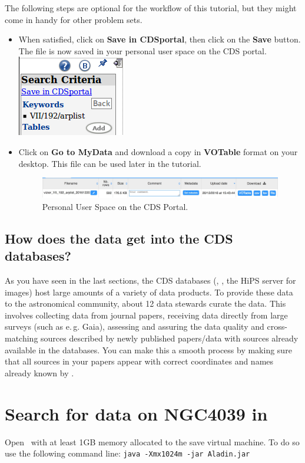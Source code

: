 \documentclass [a4paper, 12pt]{article}
\begin{document}
The following steps are optional for the workflow of this tutorial, but they
might come in handy for other problem sets.
\begin{itemize}
\item When satisfied, click on \textbf{Save in CDSportal}, then click
on the \textbf{Save} button. The file is now saved in your personal
user space on the CDS portal.\includegraphics[width=0.1
\textwidth]{../images/vizier_saveto_CDSportal.png}
\item Click on \textbf{Go to MyData} and download a copy in
\textbf{VOTable} format on your desktop. This file can be used later
in the tutorial.
\begin{figure}[H]
\center
\includegraphics[width=1  \textwidth]{../images/cdsportal_mydata.jpg}
\caption{Personal User Space on the CDS Portal.}
\label{fig:download}
\end{figure}
\end{itemize}

\subsection{How does the data get into the CDS databases?}
As you have seen in the last sections, the CDS databases (\simbad, \vizier, the
HiPS server for images) host large amounts of a variety of data products. To provide these data to the astronomical community, about 12 data stewards curate the data. This involves collecting
data from journal papers, receiving data directly from large surveys (such as
e.\,g. Gaia), assessing and assuring the data quality and cross-matching
sources described by newly published papers/data with sources already available
in the databases. You can make this a smooth process by making sure that all
sources in your papers appear with correct coordinates and names already known
by \simbad.

\section{Search for data on NGC4039 in \aladin}

Open \aladin\ with at least 1GB memory allocated to the save virtual
machine. To do so use the following command line: \texttt{java -Xmx1024m -jar
Aladin.jar}
\end{document}
